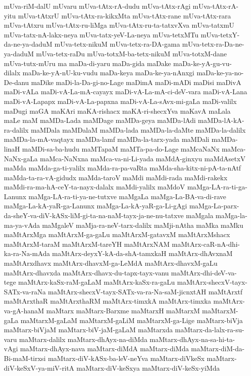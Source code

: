 {mUva-riM-dalU
mUvaru
mUva-tAtx-rA-dudu
mUva-tAtx-rAgi
mUva-tAtx-rA-yitu
mUva-tAtxrU
mUva-tAtx-ra-kikxMta
mUva-tAtx-rane
mUva-tAtx-rara
mUva-tAtxru
mUva-tAtx-ru-liMga
mUva-tAtx-ru-ta-tatxvXva
mUva-tatxmU
mUva-tatx-nA-lakx-neya
mUva-tatx-yeV-La-neya
mUva-tetxMTu
mUva-tetxY-da-ne-ya-daduM
mUva-tetx-nikuM
mUva-tetx-ra-DA-gama
mUva-tetx-ra-Da-ne-ya-daduM
mUva-tetx-raDu
mUva-totxM-ba-tetx-nikuM
mUva-totxM-dane
mUva-tutx-mUru
ma
maDa-di-yaru
maDa-gida
maDake
maDa-ke-yA-gu-vu-dilalx
maDa-ke-yA-nU-ku-vudu
maDa-keya
maDa-ke-ya-nAnxgi
maDa-ke-ya-no-De-danu
maDike
maDi-la-Da-gi-no-Lage
maDimA
maDi-mADi
maDisi
maDivA
maDi-vALa
maDi-vA-La-mA-cayayx
maDi-vA-La-mA-ci-deV-vara
maDi-vA-Lana
maDi-vA-Lapapx
maDi-vA-La-papxna
maDi-vA-La-sAvx-mi-gaLa
maDi-valilx
maDugi
maGA
maKAri
maKA-rishacx
maKA-ri-shecxYva
maKavA
maLala
maLe
maM
maMDa-Lada
maMDage
maMDa-geya
maMDa-lAdi
maMDa-lA-kA-ra-dalilx
maMDala
maMDalaM
maMDa-lada
maMDa-la-daMte
maMDa-la-dalilx
maMDa-la-mA-vaqtayx
maMDa-lamf
maMDa-la-tarx-yada
maMDali
maMDa-linaH
maMDi-sa-ba-hudu
maMTapaM
maMTa-pa-do-Lage
maMcaNaNx
maMca-NaNx-gaLa
maMca-NaNxna
maMca-va-ni-Li-yada
maMdA-ginxyu
maMdAsetxV
maMda
maMda-ga-ti-yalilx
maMda-ra-pa-vaRta
maMda-sha-kitx-ni-pA-ta-nAtf
maMda-ta-ra-vA-gidudx
maMda-taroV
maMdi
maMdi-rada
maMdi-rakekx
maMdi-ra-ma-hA-ceY-ta-nayx-dalalx
maMdi-yalilx
maMdoV
maMga-LA-ra-ti-ga-Lanunx
maMga-LA-ra-ti-ya-ne-tutxve
maMgaLa
maMga-La-BA-va-di-rave
maMga-La-kA-yaR-ga-Lanunx
maMga-La-kA-yaR-ga-Li-gAgi
maMga-La-parx-da-sheY-va-diV-kASx-liM-gi-ta-na-naM-tayx-ja-ne-nu-tatxve
maMgala
maMga-la-ma-ya-vAda
maMgaleV
maMja-ra-neV-tarx-dalilx
maMji-nAtha
maMka
maMku
maMtArxMga
maMtArxM-ga-gaLu
maMtArxM-gatavxM
maMtArxMshacx
maMtArxM-taraM
maMtArxM-tareYH
maMtArxNAM
maMtArx-caR-nA-dhi-ka-ra-Na-mAda
maMtArx-deyxY-kA-da-shA-tamxkaH
maMtArx-dhAvxnaM
maMtArxdhavx
maMtArx-dhavxM-ga-LeMdA
maMtArx-dhavxM-gaLu
maMtArx-dhavxda
maMtArx-dhavx-du-tapx-tayx-vanu
maMtArx-dhi-deV-va-tege
maMtArx-kaSx-raM-gaLaM
maMtArx-kaSx-ra-gaLu
maMtArx-shecxV-tayx-SATx-va-raNa
maMtArx-shecxV-tayx-SATx-va-ra-Na-saM-jicnxtAH
maMtArxtf
maMtArxthaR
maMtArxthaRM
maMtArx-timxkA
maMtArx-timxka
maMtArx-va-gA-hanaM
maMtarx
maMtarx-Barxme
maMtarxH
maMtarxM
maMtarxM-gaLa
maMtarxM-gaLaM
maMtarxM-gaLiM
maMtarxM-ga-Lige
maMtarx-biVja
maMtarx-biVjaM
maMtarx-biV-jaM-gaLaM
maMtarxda
maMtarx-da-lalx-ra-su-varu
maMtarx-dalilx
maMtarx-dhAyx-na-diMda
maMtarx-dhAyx-na-sa-hi-ta-vAgi
maMtarx-dhAyx-nava
maMtarx-diMdA
maMtarx-diMda
maMtarx-diM-da-Bi-maM-tirxsi
maMtarx-diV-kASx-ba-leV-neYva
maMtarx-diVkeSx
maMtarx-diV-keSxV-ya-miV-ritA
maMtarx-diV-keSxya
maMtarx-diV-keSx-yiMda
}
